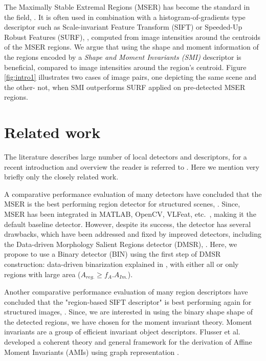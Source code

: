 \documentclass[a4paper,11pt]{article}
\begin{document}
The Maximally Stable Extremal Regions (MSER) has become the standard in the field, \cite{ Matas2002BMVC}. It is often used in combination with a histogram-of-gradients type descriptor such as Scale-invariant Feature Transform (SIFT) or Speeded-Up Robust Features (SURF), \cite{Bay2008}, computed from image intensities around the centroids of the MSER regions. We argue that using the shape and moment information of the  regions encoded by a {\em Shape and Moment Invariants (SMI)} descriptor is beneficial, compared to image intensities around the region's centroid. Figure \ref{fig:intro1} illustrates two cases of image pairs, one depicting the same scene and the other- not, when SMI outperforms SURF applied on pre-detected MSER regions.

\section{Related work}
The literature describes large number of local detectors and descriptors, for a recent introduction and overview the reader is referred to \cite{Hassaballah:2016}. Here we mention very briefly only the closely related work.

A comparative performance evaluation of many detectors have concluded that the MSER is the best performing region detector for structured scenes, \cite{Mikolajczyk:2005}. Since, MSER has been integrated in MATLAB, OpenCV, VLFeat, etc.~, making it the default baseline detector. However, despite its success, the detector has several drawbacks, which have been addressed and fixed by improved detectors, including the Data-driven Morphology Salient Regions detector (DMSR), \cite{Ranguelova2016AICCSA}. Here, we propose to use a Binary detector (BIN) using the first step of DMSR construction: data-driven binarization explained in \cite{Ranguelova2016AICCSA}, with either all or only regions with large area ($A_{reg.} \ge f_A.A_{Im.}$).

Another comparative performance evaluation of many region descriptors have concluded that the "region-based SIFT descriptor" is best performing again for structured images, \cite{Mikolajczyk:descr:2005}. Since, we are interested in using the binary shape shape of the detected regions, we have chosen for the moment invariant theory. Moment invariants are a group of efficient invariant object descriptors. Flusser et al. developed a coherent theory and general framework for the derivation of Affine Moment Invariants (AMIs) using graph representation \cite{SukF04, Flusser09a}.
\end{document}
